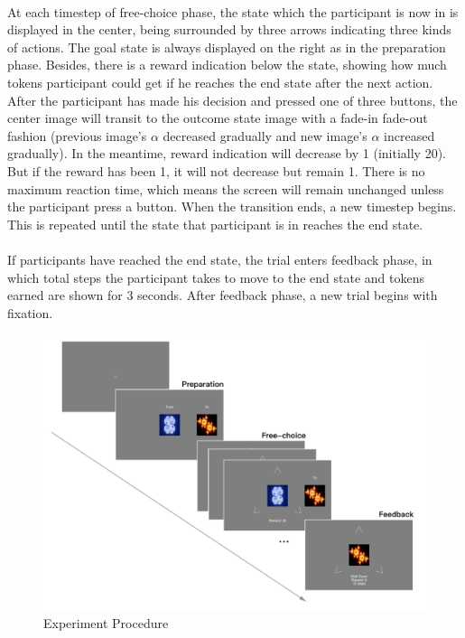 \paragraph{}
At each timestep of free-choice phase, the state which the participant is now in is displayed in the center, being surrounded by three arrows indicating three kinds of actions. The goal state is always displayed on the right as in the preparation phase. Besides, there is a reward indication below the state, showing how much tokens participant could get if he reaches the end state after the next action. After the participant has made his decision and pressed one of three buttons, the center image will transit to the outcome state image with a fade-in fade-out fashion (previous image's $\alpha$ decreased gradually and new image's $\alpha$ increased gradually). In the meantime, reward indication will decrease by 1 (initially 20). But if the reward has been 1, it will not decrease but remain 1. There is no maximum reaction time, which means the screen will remain unchanged unless the participant press a button. When the transition ends, a new timestep begins. This is repeated until the state that participant is in reaches the end state. 
\paragraph{}
If participants have reached the end state, the trial enters feedback phase, in which total steps the participant takes to move to the end state and tokens earned are shown for 3 seconds. After feedback phase, a new trial begins with fixation. 

\begin{figure}[ht]
\centering
\includegraphics[width=\columnwidth]{Figures/experiment_procedure}
\decoRule
\caption{Experiment Procedure}
\label{fig:Experiment Procedure}
\end{figure}


